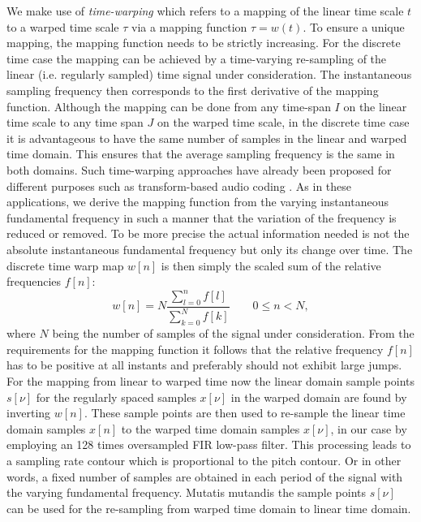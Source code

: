 We make use of \emph{time-warping} which refers to a mapping of the linear
time scale $t$ to a warped time scale $\tau$ via a mapping function
$\tau=w(t)$. To ensure a unique mapping, the mapping function needs to be strictly increasing. For the discrete time case the mapping can be achieved by a time-varying re-sampling of the linear (i.e. regularly sampled) time signal under consideration.
The instantaneous sampling frequency then corresponds to the first derivative of
the mapping function. Although the mapping can be done from any time-span
$I$ on the linear time scale to any time span $J$ on the warped time scale, in
the discrete time case it is advantageous to have the same number of samples
in the linear and warped time domain. This ensures that the average sampling
frequency is the same in both domains. Such time-warping approaches have already
been proposed for different purposes such as transform-based audio coding
\cite{edler09}. As in these applications, we derive the mapping function from
the varying instantaneous fundamental frequency in such a manner that the variation of the frequency is
reduced or removed. To be more precise the actual information needed is not
the absolute instantaneous fundamental frequency but only its change over time.
The discrete time warp map $w[n]$ is then simply the scaled sum of the relative
frequencies $f[n]$:
\begin{equation}
w[n]=N \frac{\sum^n_{l=0}{f[l]}}{\sum^N_{k=0}{f[k]}}  \qquad 0\leq n<N,
\end{equation}
where $N$ being the number of samples of the signal under consideration.
From the requirements for the mapping function it follows that the relative
frequency $f[n]$ has to be positive at all instants and preferably should not
exhibit large jumps.
For the mapping from linear to warped time now the linear domain sample points
$s[\nu]$ for the regularly spaced samples $x[\nu]$ in the warped domain are
found by inverting $w[n]$. These sample points are then used to re-sample the linear time
domain samples $x[n]$ to the warped time domain samples $x[\nu]$, in our case
by employing an 128 times oversampled FIR low-pass filter. This processing leads to a sampling rate contour which is proportional to the pitch contour. Or in other words, a fixed number of samples are obtained in each period of the signal with the varying fundamental frequency. Mutatis mutandis the sample points $s[\nu]$ can be used for the re-sampling from warped time domain to linear time
domain. \\

